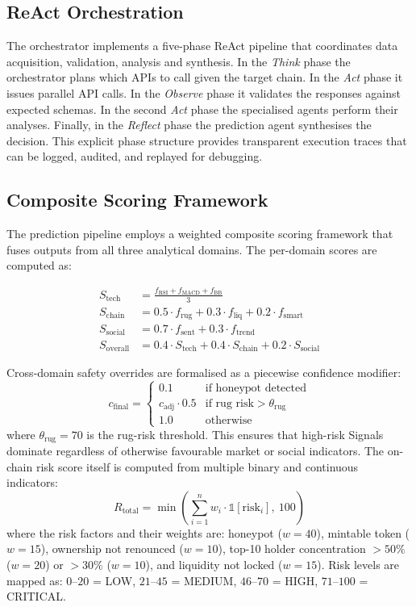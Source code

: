 \documentclass[12pt,a4paper,oneside,openany]{book}
\begin{document}
\subsection{ReAct Orchestration}
The orchestrator implements a five-phase ReAct pipeline that coordinates data acquisition, validation, analysis and synthesis. In the \emph{Think} phase the orchestrator plans which APIs to call given the target chain. In the \emph{Act} phase it issues parallel API calls. In the \emph{Observe} phase it validates the responses against expected schemas. In the second \emph{Act} phase the specialised agents perform their analyses. Finally, in the \emph{Reflect} phase the prediction agent synthesises the decision. This explicit phase structure provides transparent execution traces that can be logged, audited, and replayed for debugging.

\subsection{Composite Scoring Framework}
The prediction pipeline employs a weighted composite scoring framework that fuses outputs from all three analytical domains. The per-domain scores are computed as:

\begin{align}
S_{\mathrm{tech}}   &= \frac{f_{\mathrm{RSI}} + f_{\mathrm{MACD}} + f_{\mathrm{BB}}}{3}\\
S_{\mathrm{chain}}  &= 0.5 \cdot f_{\mathrm{rug}} + 0.3 \cdot f_{\mathrm{liq}} + 0.2 \cdot f_{\mathrm{smart}}\\
S_{\mathrm{social}} &= 0.7 \cdot f_{\mathrm{sent}} + 0.3 \cdot f_{\mathrm{trend}}\\
S_{\mathrm{overall}} &= 0.4 \cdot S_{\mathrm{tech}} + 0.4 \cdot S_{\mathrm{chain}} + 0.2 \cdot S_{\mathrm{social}}
\end{align}

Cross-domain safety overrides are formalised as a piecewise confidence modifier:
\begin{equation}
c_{\mathrm{final}} = \begin{cases}
0.1 & \text{if honeypot detected}\\
c_{\mathrm{adj}} \cdot 0.5 & \text{if rug risk} > \theta_{\mathrm{rug}}\\
1.0 & \text{otherwise}
\end{cases}
\end{equation}
where $\theta_{\mathrm{rug}} = 70$ is the rug-risk threshold. This ensures that high-risk Signals dominate regardless of otherwise favourable market or social indicators. The on-chain risk score itself is computed from multiple binary and continuous indicators:
\begin{equation}
R_{\mathrm{total}} = \min\left(\sum_{i=1}^{n} w_i \cdot \mathbb{1}[\mathrm{risk}_i],\ 100\right)
\end{equation}
where the risk factors and their weights are: honeypot ($w = 40$), mintable token ($w = 15$), ownership not renounced ($w = 10$), top-10 holder concentration $>50\%$ ($w = 20$) or $>30\%$ ($w = 10$), and liquidity not locked ($w = 15$). Risk levels are mapped as: $0$--$20$ = LOW, $21$--$45$ = MEDIUM, $46$--$70$ = HIGH, $71$--$100$ = CRITICAL.
\end{document}
